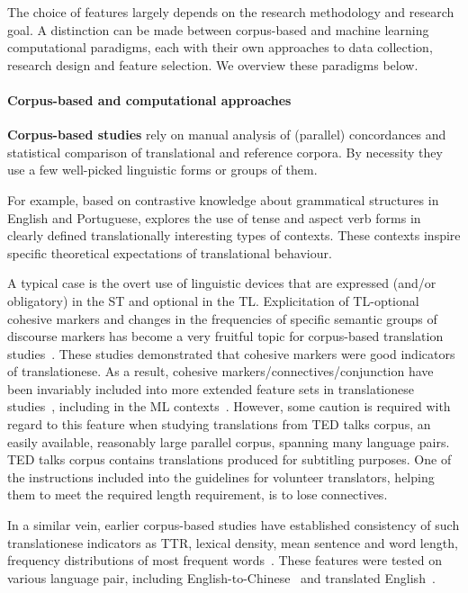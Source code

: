 The choice of features largely depends on the research methodology and research goal. A distinction can be made between corpus-based and machine learning computational paradigms, each with their own approaches to data collection, research design and feature selection. We overview these paradigms below.

\paragraph{Corpus-based and computational approaches} 
\label{pg:coling_begin}
\textbf{Corpus-based studies} rely on manual analysis of (parallel) concordances and statistical comparison of translational and reference corpora. By necessity they use a few well-picked linguistic forms or groups of them. 

For example, based on contrastive knowledge about grammatical structures in English and Portuguese, \citet{Santos1995} explores the use of tense and aspect verb forms in clearly defined translationally interesting types of contexts. These contexts inspire specific theoretical expectations of translational behaviour. 

A typical case is the overt use of linguistic devices that are expressed (and/or obligatory) in the \gls{ST} and optional in the \gls{TL}. 
Explicitation of TL-optional cohesive markers and changes in the frequencies of specific semantic groups of discourse markers has become a very fruitful topic for corpus-based translation studies~\cite{Olohan2001,Nakamura2007,Castagnoli2009,Becher2011,Kunilovskaya2017conn}. These studies demonstrated that cohesive markers were good indicators of translationese. As a result, cohesive markers/connectives/conjunction have been invariably included into more extended feature sets in translationese studies~\cite{Puurtinen2003,Rabadan2009,Xiao2010,Redelinghuys2015}, including in the ML contexts~\cite{Volansky2015}.
However, some caution is required with regard to this feature when studying translations from TED talks corpus, an easily available, reasonably large parallel corpus, spanning many language pairs. TED talks corpus contains translations produced for subtitling purposes. One of the instructions included into the guidelines for volunteer translators, helping them to meet the required length requirement, is to lose connectives.  

In a similar vein, earlier corpus-based studies have established consistency of such translationese indicators as \gls{TTR}, lexical density, mean sentence and word length, frequency distributions of most frequent words~\cite[known as `list head' from][]{Laviosa1998}. These features were tested on various language pair, including English-to-Chinese~\cite{Xiao2010} and translated English~\cite{Kruger2012,Redelinghuys2015}.

